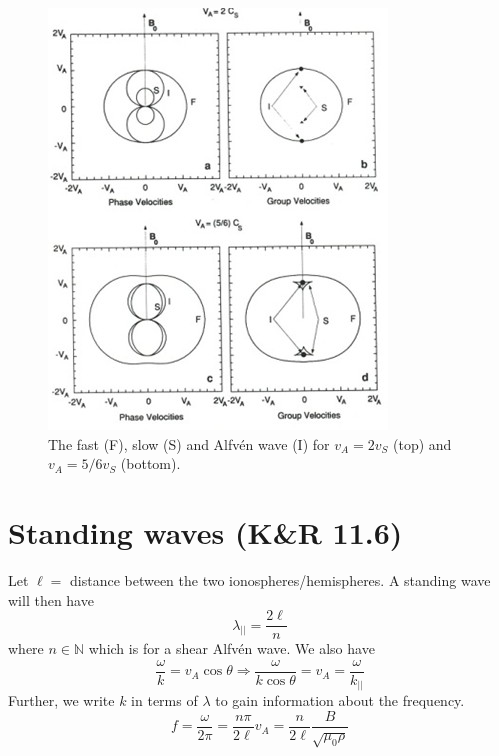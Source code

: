 \begin{figure}[t]
    \centering
    \includegraphics[width=.6\linewidth]{bilder/L7_alfven_waves.jpg}
    \caption{The fast (F), slow (S) and Alfvén wave (I) for \(v_A=2v_S\) (top) and \(v_A=5/6v_S\) (bottom).}\label{fig:L7_alfven_waves}
\end{figure}

\section[Standing waves]{Standing waves (K\&R 11.6)}
Let \(\ell=\) distance between the two ionospheres/hemispheres. A standing wave will then have
\begin{equation*}
    \lambda_{||}=\frac{2\ell}{n}
\end{equation*}
where \(n\in\mathbb{N}\) which is for a shear Alfvén wave. We also have
\begin{equation*}
    \frac{\omega}{k}=v_A\cos\theta\Rightarrow\frac{\omega}{k\cos\theta}=v_A=\frac{\omega}{k_{||}}
\end{equation*}
Further, we write \(k\) in terms of \(\lambda \) to gain information about the frequency.
\begin{equation*}
    f=\frac{\omega}{2\pi}=\frac{n\pi}{2\ell}v_A=\frac{n}{2\ell}\frac{B}{\sqrt{\mu_0\rho}}
\end{equation*}